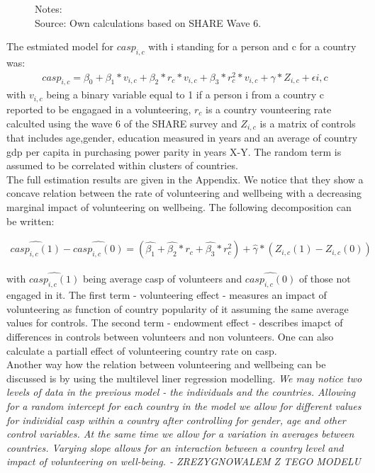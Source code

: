 \documentclass[10pt, letterpaper]{article}
\begin{document}
\begin{spacing}{1.4}
\begin{figure}[H]
\begin{minipage}{1\linewidth}
{\footnotesize Notes: }~\\
{\footnotesize Source: Own calculations based on SHARE Wave 6.}
\end{minipage}
\end{figure} 

The estmiated model for $casp_{i,c}$ with i standing for a person and c for a country was:
 \begin{eqnarray}
	casp_{i,c}= \beta_{0}+ \beta_{1}*v_{i,c} + \beta_{2}*r_{c}*v_{i,c}+\beta_{3}*r^{2}_{c}*v_{i,c}+\gamma*Z_{i,c} + \epsilon{i,c}
 \end{eqnarray}
with $v_{i,c}$ being a binary variable equal to 1 if a person i from a country c reported to be engagaed in a volunteering, $r_{c}$ is a country vounteering rate calculted using the wave 6 of the SHARE survey and $Z_{i,c}$ is a matrix of controls that includes age,gender, education measured in years and an average of country gdp per capita in purchasing power parity in years X-Y. The random term is assumed to be correlated within clusters of countries.  \\
  
The full estimation results are given in the Appendix. We notice that they show a concave relation between the rate of volunteering and wellbeing with a decreasing marginal impact of volunteering on wellbeing. The following decomposition can be written:

 \begin{eqnarray}
	\hat{casp_{i,c}(1)}-\hat{casp_{i,c}(0)}= (\hat{\beta_{1}}+\hat{\beta_{2}}*r_{c}+\hat{\beta_{3}}*r^{2}_{c})+\hat{\gamma}*(Z_{i,c}(1)-Z_{i,c}(0))
 \end{eqnarray}
       
with $\hat{casp_{i,c}(1)}$ being average casp of volunteers and $  \hat{casp_{i,c}(0)}$ of those not engaged in it. The first term - volunteering effect - measures an impact of volunteering as function of country popularity of it assuming the same average values for controls. The second term - endowment effect - describes imapct of differences in controls between volunteers and non volunteers. One can also calculate a partiall effect of volunteering country rate on casp.  \\   
 
Another way how the relation between volunteering and wellbeing can be discussed is by using the multilevel liner regression modelling.\textit{ We may notice two levels of data in the previous model - the individuals and the countries. Allowing for a random intercept for each country in the model we allow for different values for individial casp within a country after controlling for gender, age and other control variables. At the same time we allow for a variation in averages between countries.  Varying slope allows for an interaction between a country level and impact of volunteering on well-being. - ZREZYGNOWALEM Z TEGO MODELU } \\



\end{spacing}
\end{document}

